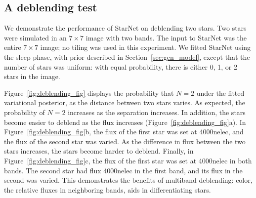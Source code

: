 \subsection{A deblending test}
\label{sec:deblending_test}

We demonstrate the performance of StarNet on deblending two stars. Two stars were simulated in an $7\times 7$ image with two bands. 
The input to StarNet was the entire $7\times 7$ image; no tiling was used in this experiment. 
We fitted StarNet using the sleep phase, with prior described in Section~\ref{sec:gen_model}, except that the number of stars was uniform: with equal probability, there is either 0, 1, or 2 stars in the image. 

Figure~\ref{fig:deblending_fig} displays the probability that $N = 2$ under the fitted variational posterior, as the distance between two stars varies.
As expected, the probability of $N=2$ increases as the separation increases. 
In addition, the stars become easier to deblend as the flux increases (Figure~\ref{fig:deblending_fig}a). 
In Figure~\ref{fig:deblending_fig}b, the flux of the first star was set at 4000nelec, and the flux of the second star was varied. 
As the difference in flux between the two stars increases, the stars become harder to deblend. 
Finally, in Figure~\ref{fig:deblending_fig}c, the flux of the first star was set at 4000nelec in both bands. The second star had flux 4000nelec in the first band, and its flux in the second was varied. 
This demonstrates the benefits of multiband deblending: color, 
the relative fluxes in neighboring bands, aids in differentiating stars. 

